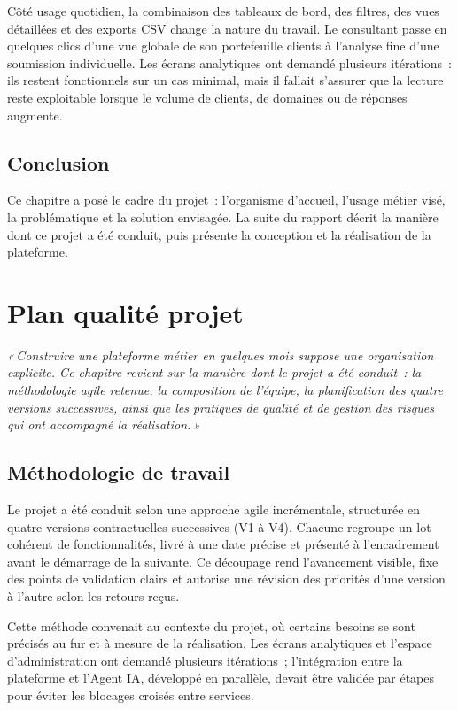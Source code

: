 \documentclass[12pt,a4paper]{report}
\newcommand{\chapterintro}[1]{
    \vspace*{4cm}
    \begin{center}
        \begin{minipage}{0.78\textwidth}
            \centering
            \itshape «\,#1\,»
        \end{minipage}
    \end{center}
    \clearpage
}
\begin{document}
Côté usage quotidien, la combinaison des tableaux de bord, des filtres, des vues détaillées et des exports CSV change la nature du travail. Le consultant passe en quelques clics d'une vue globale de son portefeuille clients à l'analyse fine d'une soumission individuelle. Les écrans analytiques ont demandé plusieurs itérations~: ils restent fonctionnels sur un cas minimal, mais il fallait s'assurer que la lecture reste exploitable lorsque le volume de clients, de domaines ou de réponses augmente.


\section{Conclusion}
Ce chapitre a posé le cadre du projet~: l'organisme d'accueil, l'usage métier visé, la problématique et la solution envisagée. La suite du rapport décrit la manière dont ce projet a été conduit, puis présente la conception et la réalisation de la plateforme.

\chapter{Plan qualité projet}
\chapterintro{Construire une plateforme métier en quelques mois suppose une organisation explicite. Ce chapitre revient sur la manière dont le projet a été conduit~: la méthodologie agile retenue, la composition de l'équipe, la planification des quatre versions successives, ainsi que les pratiques de qualité et de gestion des risques qui ont accompagné la réalisation.}

\section{Méthodologie de travail}
Le projet a été conduit selon une approche agile incrémentale, structurée en quatre versions contractuelles successives (V1 à V4). Chacune regroupe un lot cohérent de fonctionnalités, livré à une date précise et présenté à l'encadrement avant le démarrage de la suivante. Ce découpage rend l'avancement visible, fixe des points de validation clairs et autorise une révision des priorités d'une version à l'autre selon les retours reçus.

Cette méthode convenait au contexte du projet, où certains besoins se sont précisés au fur et à mesure de la réalisation. Les écrans analytiques et l'espace d'administration ont demandé plusieurs itérations~; l'intégration entre la plateforme et l'Agent IA, développé en parallèle, devait être validée par étapes pour éviter les blocages croisés entre services.
\end{document}
